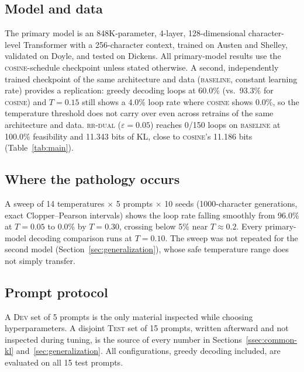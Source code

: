 \documentclass[make,article,submit,pdftex]{Definitions/mdpi}
\begin{document}
\subsection{Model and data}
The primary model is an 848K-parameter, 4-layer, 128-dimensional character-level Transformer with a 256-character context, trained on Austen and Shelley, validated on Doyle, and tested on Dickens. All primary-model results use the \textsc{cosine}-schedule checkpoint unless stated otherwise. A second, independently trained checkpoint of the same architecture and data (\textsc{baseline}, constant learning rate) provides a replication: greedy decoding loops at 60.0\% (vs.\ 93.3\% for \textsc{cosine}) and $T{=}0.15$ still shows a 4.0\% loop rate where \textsc{cosine} shows 0.0\%, so the temperature threshold does not carry over even across retrains of the same architecture and data. \textsc{rr-dual} ($\varepsilon{=}0.05$) reaches 0/150 loops on \textsc{baseline} at 100.0\% feasibility and 11.343 bits of KL, close to \textsc{cosine}'s 11.186 bits (Table~\ref{tab:main}).

\subsection{Where the pathology occurs}
A sweep of 14 temperatures $\times$ 5 prompts $\times$ 10 seeds (1000-character generations, exact Clopper--Pearson intervals) shows the loop rate falling smoothly from 96.0\% at $T{=}0.05$ to 0.0\% by $T{=}0.30$, crossing below 5\% near $T{\approx}0.2$. Every primary-model decoding comparison runs at $T{=}0.10$. The sweep was not repeated for the second model (Section~\ref{sec:generalization}), whose safe temperature range does not simply transfer.

\subsection{Prompt protocol}
A \textsc{Dev} set of 5 prompts is the only material inspected while choosing hyperparameters. A disjoint \textsc{Test} set of 15 prompts, written afterward and not inspected during tuning, is the source of every number in Sections~\ref{ssec:common-kl} and~\ref{sec:generalization}. All configurations, greedy decoding included, are evaluated on all 15 test prompts.
\end{document}
